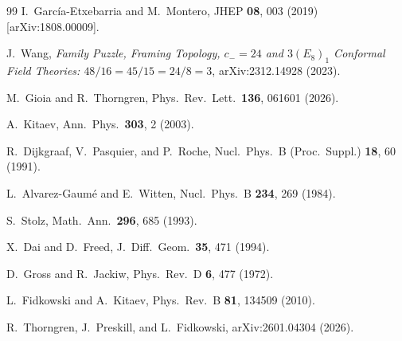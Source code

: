 \documentclass[aps,prl,twocolumn,superscriptaddress]{revtex4-2}
\begin{document}
\begin{thebibliography}{99}
I.~Garc\'ia-Etxebarria and M.~Montero,
JHEP \textbf{08}, 003 (2019) [arXiv:1808.00009].

J.~Wang, \emph{Family Puzzle, Framing Topology, $c_-=24$ and $3(E_8)_1$
Conformal Field Theories: $48/16 = 45/15 = 24/8 = 3$}, arXiv:2312.14928 (2023).

M.~Gioia and R.~Thorngren,
Phys.\ Rev.\ Lett.\ \textbf{136}, 061601 (2026).

A.~Kitaev, Ann.\ Phys.\ \textbf{303}, 2 (2003).

R.~Dijkgraaf, V.~Pasquier, and P.~Roche,
Nucl.\ Phys.\ B (Proc.\ Suppl.) \textbf{18}, 60 (1991).

L.~Alvarez-Gaum\'e and E.~Witten,
Nucl.\ Phys.\ B \textbf{234}, 269 (1984).

S.~Stolz, Math.\ Ann.\ \textbf{296}, 685 (1993).

X.~Dai and D.~Freed,
J.~Diff.\ Geom.\ \textbf{35}, 471 (1994).

D.~Gross and R.~Jackiw,
Phys.\ Rev.\ D \textbf{6}, 477 (1972).

L.~Fidkowski and A.~Kitaev,
Phys.\ Rev.\ B \textbf{81}, 134509 (2010).

R.~Thorngren, J.~Preskill, and L.~Fidkowski,
arXiv:2601.04304 (2026).
\end{thebibliography}
\end{document}
